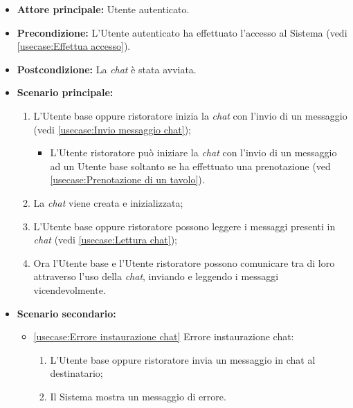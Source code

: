 \label{usecase:Comunicazione attraverso chat}
\begin{itemize}
	\item \textbf{Attore principale:} Utente autenticato.

	\item \textbf{Precondizione:} L'Utente autenticato ha effettuato l'accesso al Sistema (vedi \autoref{usecase:Effettua accesso}).

	\item \textbf{Postcondizione:} La \textit{chat} è stata avviata.

	\item \textbf{Scenario principale:}
            \begin{enumerate}
				\item L'Utente base oppure ristoratore inizia la \textit{chat} con l'invio di un messaggio (vedi \autoref{usecase:Invio messaggio chat});
                \begin{itemize}
					\item L'Utente ristoratore può iniziare la \textit{chat} con l'invio di un messaggio ad un Utente base soltanto se ha effettuato una prenotazione (ved \autoref{usecase:Prenotazione di un tavolo}).
				\end{itemize}
				\item La \textit{chat} viene creata e inizializzata;
				\item L'Utente base oppure ristoratore possono leggere i messaggi presenti in \textit{chat} (vedi \autoref{usecase:Lettura chat});
                \item Ora l'Utente base e l'Utente ristoratore possono comunicare tra di loro attraverso l'uso della \textit{chat}, inviando e leggendo i messaggi vicendevolmente.
	      \end{enumerate}

    \item \textbf{Scenario secondario:}
		  \begin{itemize}
			  \item \autoref{usecase:Errore instaurazione chat} Errore instaurazione chat:
				\begin{enumerate}
					\item L'Utente base oppure ristoratore invia un messaggio in chat al destinatario;
					\item Il Sistema mostra un messaggio di errore.
				\end{enumerate}
		  \end{itemize}
\end{itemize}